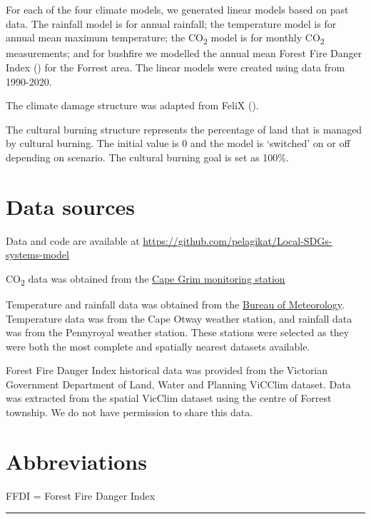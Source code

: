 \documentclass[
  11pt,
]{book}
\begin{document}
For each of the four climate models, we generated linear models based on past data. The rainfall model is for annual rainfall; the temperature model is for annual mean maximum temperature; the CO\textsubscript{2} model is for monthly CO\textsubscript{2} measurements; and for bushfire we modelled the annual mean Forest Fire Danger Index (\citet{matthews_comparison_2009}) for the Forrest area. The linear models were created using data from 1990-2020.

The climate damage structure was adapted from FeliX (\citet{rydzak_impact_2010}).

The cultural burning structure represents the percentage of land that is managed by cultural burning. The initial value is 0 and the model is `switched' on or off depending on scenario. The cultural burning goal is set as 100\%.

\hypertarget{data-sources-5}{%
\section{Data sources}\label{data-sources-5}}

Data and code are available at \url{https://github.com/pelagikat/Local-SDGs-systems-model}

CO\textsubscript{2} data was obtained from the \href{https://www.csiro.au/en/research/natural-environment/atmosphere/latest-greenhouse-gas-data}{Cape Grim monitoring station}

Temperature and rainfall data was obtained from the \href{http://www.bom.gov.au/climate/data/?ref=ftr}{Bureau of Meteorology}. Temperature data was from the Cape Otway weather station, and rainfall data was from the Pennyroyal weather station. These stations were selected as they were both the most complete and spatially nearest datasets available.

Forest Fire Danger Index historical data was provided from the Victorian Government Department of Land, Water and Planning ViCClim dataset. Data was extracted from the spatial VicClim dataset using the centre of Forrest township. We do not have permission to share this data.

\hypertarget{abbreviations}{%
\section{Abbreviations}\label{abbreviations}}

FFDI = Forest Fire Danger Index

\begin{center}\rule{0.5\linewidth}{0.5pt}\end{center}
\end{document}
